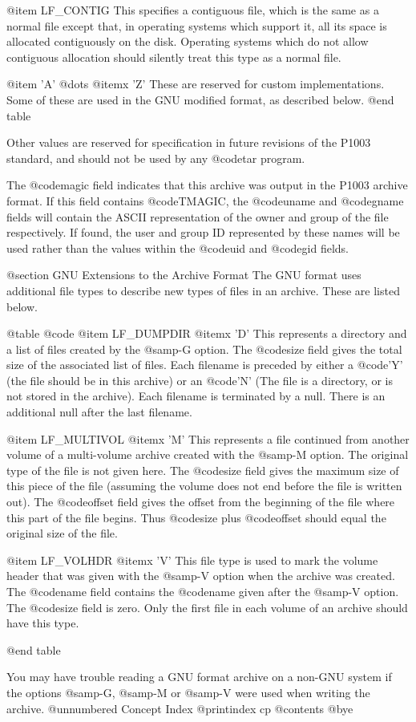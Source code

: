 @item LF_CONTIG
This specifies a contiguous file, which is the same as a normal
file except that, in operating systems which support it,
all its space is allocated contiguously on the disk.  Operating
systems which do not allow contiguous allocation should silently treat
this type as a normal file.

@item 'A' @dots{}
@itemx 'Z'
These are reserved for custom implementations.  Some of these are
used in the GNU modified format, as described below.
@end table

Other values are reserved for specification in future revisions of
the P1003 standard, and should not be used by any @code{tar} program.

The @code{magic} field indicates that this archive was output in the
P1003 archive format.  If this field contains @code{TMAGIC}, the
@code{uname} and @code{gname} fields will contain the ASCII
representation of the owner and group of the file respectively.  If
found, the user and group ID represented by these names will be used
rather than the values within the @code{uid} and @code{gid} fields.

@section GNU Extensions to the Archive Format
The GNU format uses additional file types to describe new types of
files in an archive.  These are listed below.

@table @code
@item LF_DUMPDIR
@itemx 'D'
This represents a directory and a list of files created by the
@samp{-G} option.  The @code{size} field gives the total size of the
associated list of files.  Each filename is preceded by either a @code{'Y'}
(the file should be in this archive) or an @code{'N'} (The file is a
directory, or is not stored in the archive).  Each filename is
terminated by a null.  There is an additional null after the last
filename.

@item LF_MULTIVOL
@itemx 'M'
This represents a file continued from another volume of a
multi-volume archive created with the @samp{-M} option.  The original
type of the file is not given here.  The @code{size} field gives the
maximum size of this piece of the file (assuming the volume does not
end before the file is written out).  The @code{offset} field gives
the offset from the beginning of the file where this part of the
file begins.  Thus @code{size} plus @code{offset} should equal the
original size of the file.

@item LF_VOLHDR
@itemx 'V'
This file type is used to mark the volume header that was given with
the @samp{-V} option when the archive was created.  The @code{name}
field contains the @code{name} given after the @samp{-V} option.
The @code{size} field is zero.  Only the first file in each volume
of an archive should have this type.

@end table

You may have trouble reading a GNU format archive on a non-GNU system
if the options @samp{-G}, @samp{-M} or @samp{-V} were used when writing
the archive.
@unnumbered Concept Index
@printindex cp
@contents
@bye
